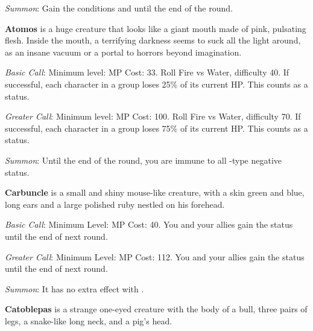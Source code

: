 \begin{multicols}{2}
    \textit{Summon}: Gain the conditions  and   until the end of the round. 

    \ffcrystal[type=level,height=8pt]
    
    \textbf{Atomos} is a huge creature that looks like a giant mouth made of pink, pulsating flesh. Inside the mouth, a terrifying darkness seems to suck all the light around, as an insane vacuum or a portal to horrors beyond imagination.
    
    \textit{Basic Call}: Minimum level:  MP Cost: 33. Roll Fire vs Water, difficulty 40. If successful, each character in a group loses 25\% of its current HP\@. This counts as a  status.
    
    \textit{Greater Call}: Minimum level:  MP Cost: 100. Roll Fire vs Water, difficulty 70. If successful, each character in a group loses 75\% of its current HP\@. This counts as a  status.
    
    \textit{Summon}: Until the end of the round, you are immune to all -type negative status.

    \ffcrystal[type=level,height=8pt]
    
    \textbf{Carbuncle} is a small and shiny mouse-like creature, with a skin green and blue, long ears and a large polished ruby nestled on his forehead.
    
    \textit{Basic Call}: Minimum Level:  MP Cost: 40. You and your allies gain the  status until the end of next round.
    
    \textit{Greater Call}: Minimum Level:  MP Cost: 112. You and your allies gain the  status until the end of next round.
    
    \textit{Summon}: It has no extra effect with .

    \ffcrystal[type=level,height=8pt]
    
    \textbf{Catoblepas} is a strange one-eyed creature with the body of a bull, three pairs of legs, a snake-like long neck, and a pig's head.
    

\end{multicols}
